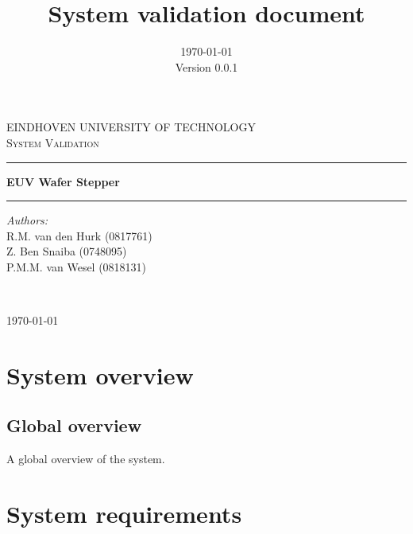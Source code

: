 \documentclass[12pt]{report}
\title{System validation document}
\date{\today \\ Version 0.0.1}
\newcounter{counter}
\begin{document}
	\begin{titlepage}
		\begin{center}
			\textsc{\Large EINDHOVEN UNIVERSITY OF TECHNOLOGY}\\[1.5cm]
			
			\textsc{\Large System Validation}\\[0.8cm]
			\hrule
			\vspace{0.5cm}
			{ \huge \bfseries EUV Wafer Stepper \\[0.4cm] }
			\hrule
			\vspace{1.5cm}
			\noindent
			\begin{minipage}[t]{0.5\textwidth}
				\begin{flushleft} \large
					\emph{Authors:}\\
					R.M. van den Hurk (0817761)\\
					Z. Ben Snaiba (0748095)\\
					P.M.M. van Wesel (0818131)\\
				\end{flushleft}
			\end{minipage}\\
			\vspace{5cm}
			\begin{minipage}[t][8cm]{0.3\textwidth}
				\begin{flushright} \large
					\today
				\end{flushright}
			\end{minipage}
			
			\vfill
			
		\end{center}
	\end{titlepage}
	
	\tableofcontents
	
	\chapter{System overview}
	
	\section{Global overview}
	A global overview of the system.
	
	\chapter{System requirements}
	
	\newcommand{\req}[1]{
		\item[\textbf{R\stepcounter{counter}\arabic{counter}}] {#1}
		\hrule
	}
	
\end{document}
